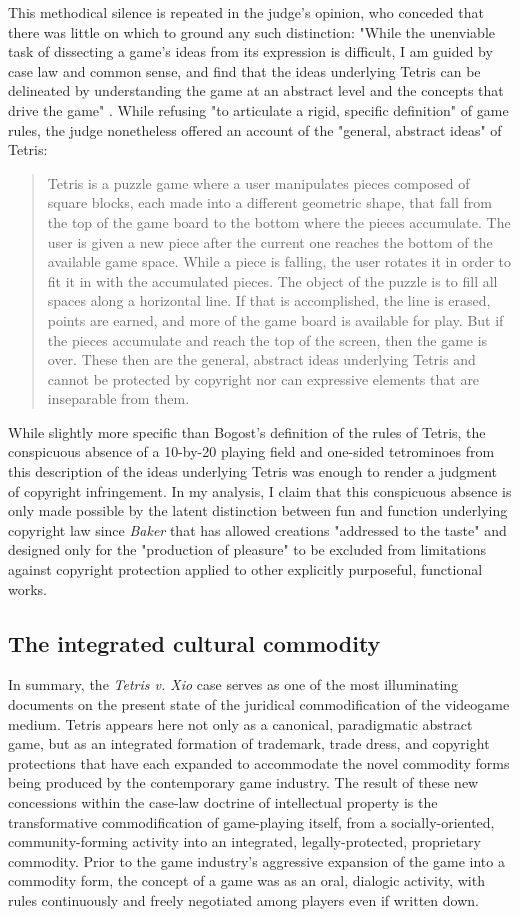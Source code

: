 This methodical silence is repeated in the judge's opinion, who conceded that there was little on which to ground any such distinction: "While the unenviable task of dissecting a game's ideas from its expression is difficult, I am guided by case law and common sense, and find that the ideas underlying Tetris can be delineated by understanding the game at an abstract level and the concepts that drive the game" \autocite[408]{tetris-xio}. While refusing "to articulate a rigid, specific definition" of game rules, the judge nonetheless offered an account of the "general, abstract ideas" of Tetris:
\blockcquote[409]{tetris-xio}{
  Tetris is a puzzle game where a user manipulates pieces composed of square blocks, each made into a different geometric shape, that fall from the top of the game board to the bottom where the pieces accumulate. The user is given a new piece after the current one reaches the bottom of the available game space. While a piece is falling, the user rotates it in order to fit it in with the accumulated pieces. The object of the puzzle is to fill all spaces along a horizontal line. If that is accomplished, the line is erased, points are earned, and more of the game board is available for play. But if the pieces accumulate and reach the top of the screen, then the game is over. These then are the general, abstract ideas underlying Tetris and cannot be protected by copyright nor can expressive elements that are inseparable from them.
  }
While slightly more specific than Bogost's definition of the rules of Tetris, the conspicuous absence of a 10-by-20 playing field and one-sided tetrominoes from this description of the ideas underlying Tetris was enough to render a judgment of copyright infringement. In my analysis, I claim that this conspicuous absence is only made possible by the latent distinction between fun and function underlying copyright law since \emph{Baker} that has allowed creations "addressed to the taste" and designed only for the "production of pleasure" to be excluded from limitations against copyright protection applied to other explicitly purposeful, functional works.

\subsection*{The integrated cultural commodity}
In summary, the \emph{Tetris v. Xio} case serves as one of the most illuminating documents on the present state of the juridical commodification of the videogame medium. Tetris appears here not only as a canonical, paradigmatic abstract game, but as an integrated formation of trademark, trade dress, and copyright protections that have each expanded to accommodate the novel commodity forms being produced by the contemporary game industry. The result of these new concessions within the case-law doctrine of intellectual property is the transformative commodification of game-playing itself, from a socially-oriented, community-forming activity into an integrated, legally-protected, proprietary commodity. Prior to the game industry's aggressive expansion of the game into a commodity form, the concept of a game was as an oral, dialogic activity, with rules continuously and freely negotiated among players even if written down.

